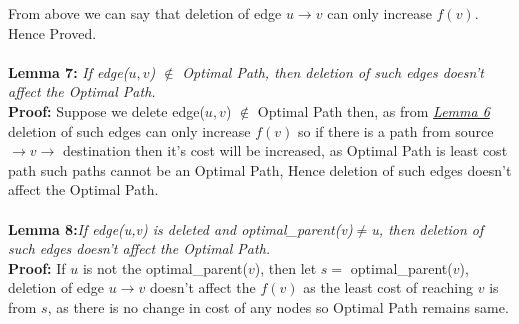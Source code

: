 \documentclass[a4paper]{article}
\begin{document}
From above we can say that deletion of edge $u \rightarrow v$ can only increase $f(v)$. Hence Proved.\\
\\
\hypertarget{Lemma 7}{\textbf{Lemma 7:}} \textit{If edge($u,v$) $\notin$ Optimal Path, then deletion of such edges doesn't affect the Optimal Path.}\\
\textbf{Proof:} Suppose we delete edge($u,v$) $\notin$ Optimal Path then, as from \hyperlink{Lemma 6}{\textit{Lemma 6}} deletion of such edges can only increase $f(v)$ so if there is a path from source $\rightarrow v \rightarrow$ destination then it's cost will be increased, as Optimal Path is least cost path such paths cannot be an Optimal Path, Hence deletion of such edges doesn't affect the Optimal Path.\\
\\
\hypertarget{Lemma 8}{\textbf{Lemma 8:}}\textit{If edge(u,v) is deleted and optimal\_parent(v)$\neq$u, then deletion of such edges doesn't affect the Optimal Path.}\\
\textbf{Proof:} If $u$ is  not the optimal\_parent($v$), then let $s =$ optimal\_parent($v$), deletion of edge $u \rightarrow v$ doesn't affect the $f(v)$ as the least cost of reaching $v$ is from $s$, as there is no change in cost of any nodes so Optimal Path remains same.\\
\end{document}
